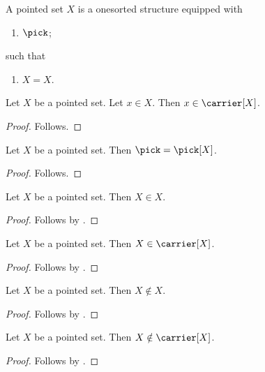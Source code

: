\begin{struct}\label{pointed_set}
    A pointed set $X$ is a onesorted structure equipped with
    \begin{enumerate}
        \item $\pick$;
    \end{enumerate}
    such that
    \begin{enumerate}
        \item\label{pointed_refl} $X = X$.
    \end{enumerate}
\end{struct}

\begin{proposition}\label{pointed_carrier}
    Let $X$ be a pointed set.
    Let $x \in X$.
    Then $x \in \carrier[X]$.
\end{proposition}
\begin{proof}
    Follows.
\end{proof}

\begin{proposition}\label{pointed_operation}
    Let $X$ be a pointed set.
    Then $\pick = \pick[X]$.
\end{proposition}
\begin{proof}
    Follows.
\end{proof}

\begin{proposition}\label{pointed_self_member}
    Let $X$ be a pointed set.
    Then $X \in X$.
\end{proposition}
\begin{proof}
    Follows by \auto.
\end{proof}

\begin{proposition}\label{pointed_self_member_explicit}
    Let $X$ be a pointed set.
    Then $X \in \carrier[X]$.
\end{proposition}
\begin{proof}
    Follows by \auto.
\end{proof}

\begin{proposition}\label{pointed_self_not_member}
    Let $X$ be a pointed set.
    Then $X \notin X$.
\end{proposition}
\begin{proof}
    Follows by \auto.
\end{proof}

\begin{proposition}\label{pointed_self_not_member_explicit}
    Let $X$ be a pointed set.
    Then $X \notin \carrier[X]$.
\end{proposition}
\begin{proof}
    Follows by \auto.
\end{proof}

